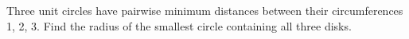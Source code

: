 Three unit circles have pairwise minimum distances between their circumferences 1, 2, 3. Find the radius of the smallest circle containing all three disks.
